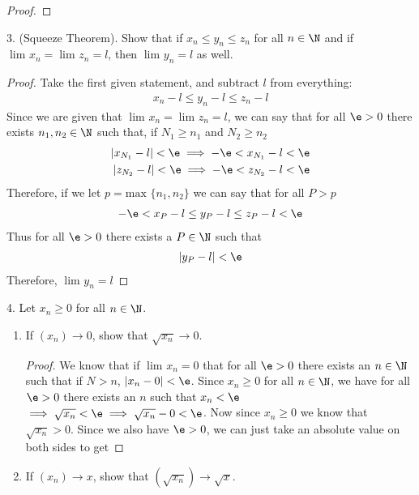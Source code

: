 \begin{enumerate}
\begin{proof}
	\end{proof}



	
	\end{enumerate}

3. (Squeeze Theorem). Show that if $x_n \le y_n \le z_n$ for all $n \in \N$ and if $\lim_{} x_n = \lim_{} z_n = l$, then $\lim_{} y_n = l$ as well.

\begin{proof}
	Take the first given statement, and subtract $l$ from everything: 
	\begin{align}
		x_n - l \le y_n - l \le z_n - l
	\end{align}
	Since we are given that $\lim_{} x_n = \lim_{} z_n = l$, we can say that for all $\e > 0$ there exists $n_1, n_2 \in \N$ such that, if $N_1 \ge  n_1$ and $N_2 \ge n_2$  
	\begin{align}
		\left|x_{N_1} - l\right| < \e \implies -\e < x_{N_1} - l < \e \\
		\left|z_{N_2} - l\right| < \e \implies -\e < z_{N_2} - l < \e
	\end{align}
	Therefore, if we let $p = \text{max }\{n_1, n_2\} $ we can say that for all $P > p$
	\begin{align}
		-\e < x_P - l \le y_P -l \le z_P - l < \e  
	\end{align}
	Thus for all $\e > 0$ there exists a $P \in \N$ such that 
	\begin{align}
		\left|y_P - l\right| < \e 
	\end{align}
	Therefore, $\lim_{} y_n = l$
	
\end{proof}

4. Let $x_n \ge 0$ for all $n \in \N$.
\begin{enumerate}
	\item If  $\left( x_n \right) \to 0$, show that $\sqrt{x_n}  \to 0$.
	\begin{proof}
		We know that if $\lim_{} x_n = 0$ that for all $\e > 0$ there exists an $n \in \N$ such that if $N > n$, $\left|x_n - 0\right| < \e$. Since $x_n \ge 0$ for all $n \in \N$, we have for all $\e > 0$ there exists an $n$ such that $x_n < \e$ $\implies \sqrt{x_n} < \e \implies \sqrt{x_n} - 0 < \e $. Now since $x_n \ge 0$ we know that $\sqrt{x_n} > 0$. Since we also have  $\e > 0$, we can just take an absolute value on both sides to get 
	\end{proof}


	\item If $\left( x_n \right) \to x$, show that $\left( \sqrt{x_n}  \right) \to \sqrt{x} $.
\end{enumerate}

